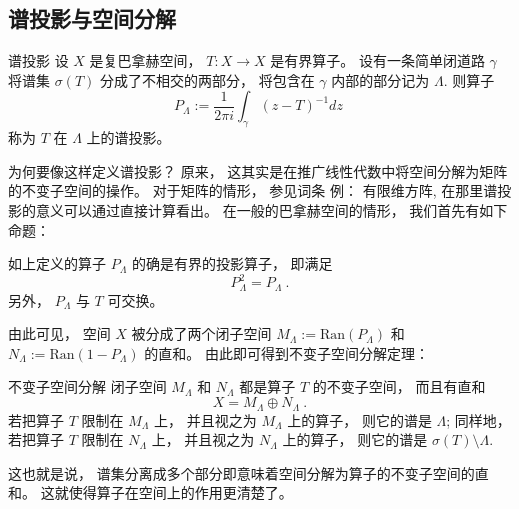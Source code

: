 

\subsection{谱投影与空间分解}
\begin{definition}{谱投影}
设 $X$ 是复巴拿赫空间， $T:X\to X$ 是有界算子。 设有一条简单闭道路 $\gamma$ 将谱集 $\sigma(T)$ 分成了不相交的两部分， 将包含在 $\gamma$ 内部的部分记为 $\Lambda$. 则算子
$$
P_\Lambda:=\frac{1}{2\pi i}\int_\gamma(z-T)^{-1}dz~
$$
称为 $T$ 在 $\Lambda$ 上的谱投影。
\end{definition}

为何要像这样定义谱投影？ 原来， 这其实是在推广线性代数中将空间分解为矩阵的不变子空间的操作。 对于矩阵的情形， 参见词条 例： 有限维方阵, 在那里谱投影的意义可以通过直接计算看出。 在一般的巴拿赫空间的情形， 我们首先有如下命题：

\begin{lemma}{}
如上定义的算子 $P_\Lambda$ 的确是有界的投影算子， 即满足
$$
P_\Lambda^2=P_\Lambda~.
$$
另外， $P_\Lambda$ 与 $T$ 可交换。
\end{lemma}

由此可见， 空间 $X$ 被分成了两个闭子空间 $M_\Lambda:=\text{Ran}(P_\Lambda)$ 和 $N_\Lambda:=\text{Ran}(1-P_\Lambda)$ 的直和。 由此即可得到不变子空间分解定理：

\begin{theorem}{不变子空间分解}
闭子空间 $M_\Lambda$ 和 $N_\Lambda$ 都是算子 $T$ 的不变子空间， 而且有直和
$$
X=M_\Lambda\oplus N_\Lambda~.
$$
若把算子 $T$ 限制在 $M_\Lambda$ 上， 并且视之为 $M_\Lambda$ 上的算子， 则它的谱是 $\Lambda$; 同样地， 若把算子 $T$ 限制在 $N_\Lambda$ 上， 并且视之为 $N_\Lambda$ 上的算子， 则它的谱是 $\sigma(T)\setminus\Lambda$.
\end{theorem}

这也就是说， 谱集分离成多个部分即意味着空间分解为算子的不变子空间的直和。 这就使得算子在空间上的作用更清楚了。

